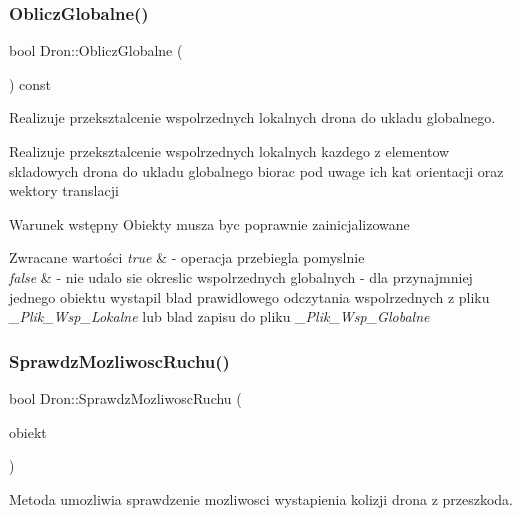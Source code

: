 \subsubsection{\texorpdfstring{Oblicz\+Globalne()}{ObliczGlobalne()}}
{\footnotesize\ttfamily bool Dron\+::\+Oblicz\+Globalne (\begin{DoxyParamCaption}{ }\end{DoxyParamCaption}) const}



Realizuje przeksztalcenie wspolrzednych lokalnych drona do ukladu globalnego. 

Realizuje przeksztalcenie wspolrzednych lokalnych kazdego z elementow skladowych drona do ukladu globalnego biorac pod uwage ich kat orientacji oraz wektory translacji

\begin{DoxyPrecond}{Warunek wstępny}
Obiekty musza byc poprawnie zainicjalizowane 
\end{DoxyPrecond}

\begin{DoxyRetVals}{Zwracane wartości}
{\em true} & -\/ operacja przebiegla pomyslnie \\
\hline
{\em false} & -\/ nie udalo sie okreslic wspolrzednych globalnych -\/ dla przynajmniej jednego obiektu wystapil blad prawidlowego odczytania wspolrzednych z pliku {\itshape \+\_\+\+Plik\+\_\+\+Wsp\+\_\+\+Lokalne} lub blad zapisu do pliku {\itshape \+\_\+\+Plik\+\_\+\+Wsp\+\_\+\+Globalne} \\
\hline
\end{DoxyRetVals}
\mbox{\label{classDron_a5ddaabc5c441d8f2f204cc398e1b0db2}} 
\subsubsection{\texorpdfstring{Sprawdz\+Mozliwosc\+Ruchu()}{SprawdzMozliwoscRuchu()}}
{\footnotesize\ttfamily bool Dron\+::\+Sprawdz\+Mozliwosc\+Ruchu (\begin{DoxyParamCaption}\item[{\hyperlink{classObiektSceny}{Obiekt\+Sceny} \&}]{obiekt }\end{DoxyParamCaption})}



Metoda umozliwia sprawdzenie mozliwosci wystapienia kolizji drona z przeszkoda. 

